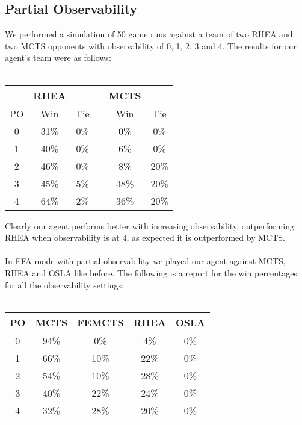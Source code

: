 \documentclass{llncs}
\begin{document}
\subsection{Partial Observability}


\noindent
We performed a simulation of 50 game runs against a team of two RHEA and two MCTS opponents with observability of 0, 1, 2, 3 and 4. The results for our agent's team were as follows: \\ \\
\vspace{3mm}
\begin{center}
\begin{tabular}{ |c|c|c|c|c|c| } 
 \hline
 & RHEA & & &MCTS & \\
 \hline
  PO   & Win &	Tie & & Win &	Tie  \\ 
  \hline
  0	&31\%	&0\%&	 &0\%	&0\%\\
  1	&40\%	& 0\%&   &6\%	& 0\%\\
  2	&46\%	& 0\%&   &8\%	& 20\%\\
  3	&45\%	& 5\%&   &38\%	& 20\%\\
  4	&64\%	& 2\%&   &36\%	& 20\%\\
 \hline
\end{tabular}
\label{sophisticatedtable}
\end{center} 


\vspace{3mm}

\noindent
Clearly our agent performs better with increasing observability, outperforming RHEA when observability is at 4, as expected it is outperformed by MCTS.\\ \\
In FFA mode with partial observability we played our agent against MCTS, RHEA and OSLA like before. The following is a  report for the win percentages for all the observability settings: \\ \\
\noindent
\begin{center}
\begin{tabular}{ |c|c|c|c|c| } 
 \hline
  PO   & MCTS &	FEMCTS & RHEA & OSLA  \\ 
  \hline
  0	&94\%	&0\% & 4\% & 0\%	 \\
  1	&66\%	& 10\% & 22\% & 0\%\\
  2	&54\%	& 10\% & 28\% & 0\%\\
  3	&40\%	& 22\% & 24\% & 0\%\\
  4	&32\%	& 28\% & 20\% & 0\%\\
 \hline
\end{tabular}
\label{sophisticatedtable}
\end{center} 
\end{document}
